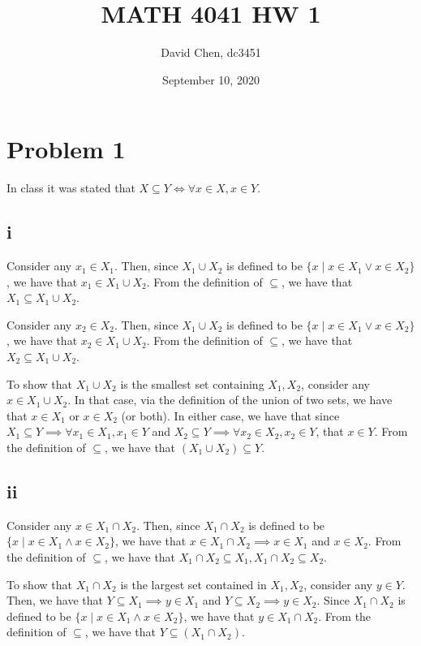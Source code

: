 \documentclass[12pt,letterpaper]{article}
\title{MATH 4041 HW 1}
\author{David Chen, dc3451}
\date{September 10, 2020}
\theoremstyle{definition}
\begin{document}
\maketitle

\section*{Problem 1}

In class it was stated that $X \subseteq Y \iff \forall x \in X, x \in Y$.

\subsection*{i}

Consider any $x_1 \in X_1$. Then, since $X_1 \cup X_2$ is defined to be $\{x \mid
x\in X_1 \lor x \in X_2\}$, we have that $x_1 \in X_1 \cup X_2$. From the
definition of $\subseteq$, we have that $X_1 \subseteq X_1 \cup X_2$.

Consider any $x_2 \in X_2$. Then, since $X_1 \cup X_2$ is defined to be $\{x \mid
x\in X_1 \lor x \in X_2\}$, we have that $x_2 \in X_1 \cup X_2$. From the
definition of $\subseteq$, we have that $X_2 \subseteq X_1 \cup X_2$.

To show that $X_1 \cup X_2$ is the smallest set containing $X_1, X_2$, consider
any $x \in X_1 \cup X_2$. In that case, via the definition of the union of two sets,
we have that $x \in X_1$ or $x \in X_2$ (or both). In either case, we have that
since $X_1 \subseteq Y \implies \forall x_1 \in X_1, x_1 \in Y$ and $X_2 \subseteq Y
\implies \forall x_2 \in X_2, x_2 \in Y$, that $x \in Y$. From the definition of
$\subseteq$, we have that $(X_1 \cup X_2) \subseteq Y$.

\subsection*{ii}

Consider any $x \in X_1 \cap X_2$. Then, since $X_1 \cap X_2$ is defined to be $\{x \mid
x\in X_1 \land x \in X_2\}$, we have that $x \in X_1 \cap X_2 \implies x \in
X_1$ and $x \in X_2$. From the definition of $\subseteq$, we have that $X_1 \cap X_2
\subseteq X_1, X_1 \cap X_2 \subseteq X_2$.

To show that $X_1 \cap X_2$ is the largest set contained in $X_1, X_2$, consider
any $y \in Y$. Then, we have that $Y \subseteq X_1 \implies y \in X_1$ and $Y
\subseteq X_2 \implies y \in X_2$. Since $X_1 \cap X_2$ is defined to be $\{x
\mid x \in X_1 \land x \in X_2\}$, we have that $y \in X_1 \cap X_2$. From the
definition of $\subseteq$, we have that $Y \subseteq (X_1 \cap X_2)$.
\end{document}
